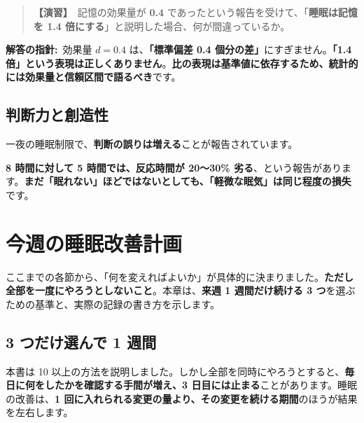 \documentclass{article}
\begin{document}
\begin{quote}
\textbf{【演習】}\ 記憶の効果量が \textbf{0.4} であったという報告を受けて、「\textbf{睡眠は記憶を 1.4 倍にする}」と説明した場合、何が間違っているか。
\end{quote}

\textbf{解答の指針:}\ 効果量 \(d = 0.4\) は、\textbf{「標準偏差 0.4 個分の差」}にすぎません。\textbf{「1.4 倍」という表現は正しくありません}。\textbf{比の表現は基準値に依存するため、統計的には効果量と信頼区間で語るべき}です。

\subsection{判断力と創造性}

一夜の睡眠制限で、\textbf{判断の誤りは増える}ことが報告されています。

\textbf{8 時間に対して 5 時間では、反応時間が 20〜30\% 劣る}、という報告があります。\textbf{まだ「眠れない」ほどではないとしても、「軽微な眠気」は同じ程度の損失}です。

\section{今週の睡眠改善計画}

ここまでの各節から、「何を変えればよいか」が具体的に決まりました。\textbf{ただし全部を一度にやろうとしないこと}。本章は、\textbf{来週 1 週間だけ続ける 3 つ}を選ぶための基準と、実際の記録の書き方を示します。

\subsection{3 つだけ選んで 1 週間}

本書は 10 以上の方法を説明しました。しかし全部を同時にやろうとすると、\textbf{毎日に何をしたかを確認する手間が増え、3 日目には止まる}ことがあります。睡眠の改善は、\textbf{1 回に入れられる変更の量より、その変更を続ける期間}のほうが結果を左右します。
\end{document}
